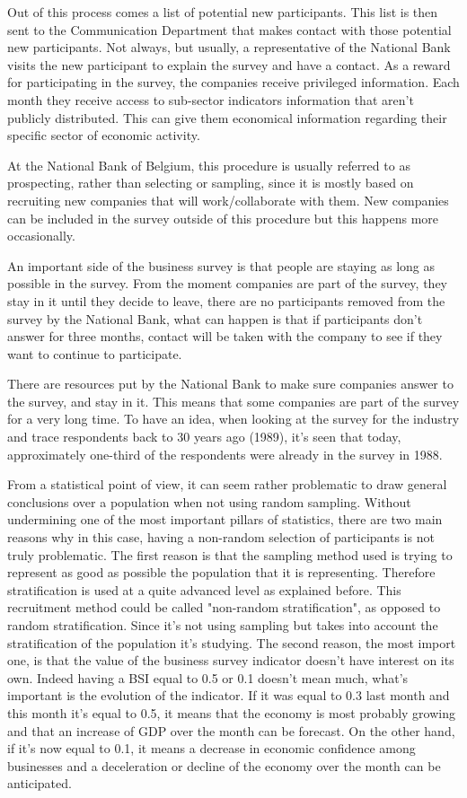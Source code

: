 \documentclass[12pt,a4paper,oneside]{book}
\begin{document}
Out of this process comes a list of potential new participants. This list is then sent to the Communication Department that makes contact with those potential new participants. 
Not always, but usually, a representative of the National Bank visits the new participant to explain the survey and have a contact.
As a reward for participating in the survey, the companies receive privileged information. Each month they receive access to sub-sector indicators information that aren't publicly distributed. This can give them economical information regarding their specific sector of economic activity.

At the National Bank of Belgium, this procedure is usually referred to as prospecting, rather than selecting or sampling, since it is mostly based on recruiting new companies that will work/collaborate with them. New companies can be included in the survey outside of this procedure but this happens more occasionally.


An important side of the business survey is that people are staying as long as possible in the survey.
From the moment companies are part of the survey, they stay in it until they decide to leave, there are no participants removed from the survey by the National Bank, what can happen is that if participants don't answer for three months, contact will be taken with the company to see if they want to continue to participate.

There are resources put by the National Bank to make sure companies answer to the survey, and stay in it.
This means that some companies are part of the survey for a very long time.
To have an idea, when looking at the survey for the industry and trace respondents back to 30 years ago (1989), it's seen that today, approximately one-third of the respondents were already in the survey in 1988.


From a statistical point of view, it can seem rather problematic to draw general conclusions over a population when not using random sampling.
Without undermining one of the most important pillars of statistics, there are two main reasons why in this case, having a non-random selection of participants is not truly problematic.
The first reason is that the sampling method used is trying to represent as good as possible the population that it is representing. Therefore stratification is used at a quite advanced level as explained before. 
This recruitment method could be called "non-random stratification", as opposed to random stratification. Since it's not using sampling but takes into account the stratification of the population it's studying.
The second reason, the most import one, is that the value of the business survey indicator doesn't have interest on its own. Indeed having a BSI equal to 0.5 or 0.1 doesn't mean much, what's important is the evolution of the indicator. If it was equal to 0.3 last month and this month it's equal to 0.5, it means that the economy is most probably growing and that an increase of GDP over the month can be forecast. On the other hand, if it's now equal to 0.1, it means a decrease in economic confidence among businesses and a deceleration or decline of the economy over the month can be anticipated.
\end{document}
